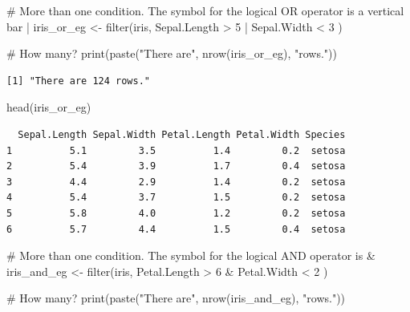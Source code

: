 \documentclass[
  letterpaper,
]{book}
\newenvironment{Shaded}{\begin{snugshade}}{\end{snugshade}}
\newcommand{\CommentTok}[1]{\textcolor[rgb]{0.37,0.37,0.37}{#1}}
\newcommand{\DecValTok}[1]{\textcolor[rgb]{0.68,0.00,0.00}{#1}}
\newcommand{\FunctionTok}[1]{\textcolor[rgb]{0.28,0.35,0.67}{#1}}
\newcommand{\NormalTok}[1]{\textcolor[rgb]{0.00,0.23,0.31}{#1}}
\newcommand{\OtherTok}[1]{\textcolor[rgb]{0.00,0.23,0.31}{#1}}
\newcommand{\SpecialCharTok}[1]{\textcolor[rgb]{0.37,0.37,0.37}{#1}}
\newcommand{\StringTok}[1]{\textcolor[rgb]{0.13,0.47,0.30}{#1}}
\begin{document}
\begin{Shaded}
\begin{Highlighting}[]
\CommentTok{\# More than one condition. The symbol for the logical OR operator is a vertical bar |}
\NormalTok{iris\_or\_eg }\OtherTok{\textless{}{-}} \FunctionTok{filter}\NormalTok{(iris, Sepal.Length }\SpecialCharTok{\textgreater{}} \DecValTok{5} \SpecialCharTok{|}\NormalTok{ Sepal.Width }\SpecialCharTok{\textless{}} \DecValTok{3}\NormalTok{ )}

\CommentTok{\# How many?}
\FunctionTok{print}\NormalTok{(}\FunctionTok{paste}\NormalTok{(}\StringTok{"There are"}\NormalTok{, }\FunctionTok{nrow}\NormalTok{(iris\_or\_eg), }\StringTok{"rows."}\NormalTok{))}
\end{Highlighting}
\end{Shaded}

\begin{verbatim}
[1] "There are 124 rows."
\end{verbatim}

\begin{Shaded}
\begin{Highlighting}[]
\FunctionTok{head}\NormalTok{(iris\_or\_eg)}
\end{Highlighting}
\end{Shaded}

\begin{verbatim}
  Sepal.Length Sepal.Width Petal.Length Petal.Width Species
1          5.1         3.5          1.4         0.2  setosa
2          5.4         3.9          1.7         0.4  setosa
3          4.4         2.9          1.4         0.2  setosa
4          5.4         3.7          1.5         0.2  setosa
5          5.8         4.0          1.2         0.2  setosa
6          5.7         4.4          1.5         0.4  setosa
\end{verbatim}

\begin{Shaded}
\begin{Highlighting}[]
\CommentTok{\# More than one condition. The symbol for the logical AND operator is \&}
\NormalTok{iris\_and\_eg }\OtherTok{\textless{}{-}} \FunctionTok{filter}\NormalTok{(iris, Petal.Length }\SpecialCharTok{\textgreater{}} \DecValTok{6} \SpecialCharTok{\&}\NormalTok{ Petal.Width }\SpecialCharTok{\textless{}} \DecValTok{2}\NormalTok{ )}

\CommentTok{\# How many?}
\FunctionTok{print}\NormalTok{(}\FunctionTok{paste}\NormalTok{(}\StringTok{"There are"}\NormalTok{, }\FunctionTok{nrow}\NormalTok{(iris\_and\_eg), }\StringTok{"rows."}\NormalTok{))}
\end{Highlighting}
\end{Shaded}
\end{document}

